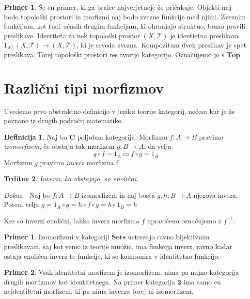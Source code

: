 \documentclass[12pt,a4paper]{book}
\theoremstyle{definition}
\newtheorem{definicija}{Definicija}[chapter]
\theoremstyle{plain}
\newtheorem{trditev}[definicija]{Trditev}
\newenvironment{dokaz}{\emph{Dokaz.}\ }{\hspace{\fill}{$\Box$}}
\theoremstyle{definition}
\newtheorem{primer}{Primer}[section]
\newtheorem*{primer*}{Primer}
\theoremstyle{remark}
\newcommand{\cat}[1]{\textbf{#1}}
\begin{document}
\begin{primer}
Še en primer, ki ga bralec najverjetneje že pričakuje. Objekti naj bodo topološki prostori in morfizmi naj bodo zvezne funkcije med njimi. Zveznim funkcijam, kot tudi učasih drugim funkcijam, ki ohranjajo struktuo, bomo pravili preslikave. Identiteta za nek topološki prostor $(X, \mathcal{T})$ je identietna preslikava $1_X : (X, \mathcal{T}) \to (X, \mathcal{T})$, ki je seveda zvezna. Kompozitum dveh preslikav je spet preslikava. Torej topološki prostori res tvorijo kategorijo. Označujemo jo s $\cat{Top}$.
\end{primer}

\section{Različni tipi morfizmov}
Uvedemo prvo abstraktno definicijo v jeziku teorije kategorij, nečesa kar je že poznano iz drugih področij matematike.

\begin{definicija} Naj bo \cat{C} poljubna kategorija. Morfizmu $f : A \to B$ pravimo \emph{izomorfizem}, če obstaja tak morfizem $g : B \to A$, da velja
$$g \circ f = 1_A \ in \ f \circ g = 1_B$$
Morfizmu $g$ pravimo \emph{inverz} morfizma f
\end{definicija}

\begin{trditev} Inverzi, ko obstajajo, so enolični.
\end{trditev}
\begin{dokaz}
Naj bo $f : A \to B$ izomorfizem in naj bosta $g,h: B \to A$ njegova inveza. Potem velja $g = 1_A \circ g = h \circ f \circ g = h \circ 1_B = h$
\end{dokaz}

Ker so inverzi enolični, lahko inverz morfizma $f$ upravičeno označujemo z $f^{-1}$.

\begin{primer*}
Izomorfizmi v kategoriji $\cat{Sets}$ ustrezajo ravno bijektivnim preslikavam, saj kot vemo iz teorije množic, ima funkcija inverz, ravno kadar ostaja enoličen inverz te funkcije, ki se komponira v identitetno funkcijo. 
\end{primer*}

\begin{primer*}
Vsak identitetni morfizem je izomorfizem, nima pa nujno kategorija drugih morfizmov kot identitetnega. Na primer kategorija $\cat{2}$ ima samo en neidentitetni morfizem, ki pa nima inverza torej ni izomorfizem.
\end{primer*}
\end{document}
